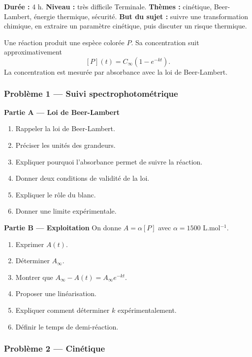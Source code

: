 \documentclass[11pt,a4paper]{article}
\begin{document}
\hypertarget{PC-EXCELLENCE-04}{}
\begin{difficile}
\textbf{Durée :} 4 h.  
\textbf{Niveau :} très difficile Terminale.  
\textbf{Thèmes :} cinétique, Beer-Lambert, énergie thermique, sécurité.  
\textbf{But du sujet :} suivre une transformation chimique, en extraire un paramètre cinétique, puis discuter un risque thermique.

\medskip

Une réaction produit une espèce colorée $P$. Sa concentration suit approximativement
\[
[P](t)=C_\infty(1-e^{-kt}).
\]
La concentration est mesurée par absorbance avec la loi de Beer-Lambert.

\subsubsection*{Problème 1 — Suivi spectrophotométrique}

\textbf{Partie A — Loi de Beer-Lambert}
\begin{enumerate}
  \item Rappeler la loi de Beer-Lambert.
  \item Préciser les unités des grandeurs.
  \item Expliquer pourquoi l'absorbance permet de suivre la réaction.
  \item Donner deux conditions de validité de la loi.
  \item Expliquer le rôle du blanc.
  \item Donner une limite expérimentale.
\end{enumerate}

\textbf{Partie B — Exploitation}
On donne $A=\alpha [P]$ avec $\alpha=1500$ L.mol$^{-1}$.
\begin{enumerate}
  \item Exprimer $A(t)$.
  \item Déterminer $A_\infty$.
  \item Montrer que $A_\infty-A(t)=A_\infty e^{-kt}$.
  \item Proposer une linéarisation.
  \item Expliquer comment déterminer $k$ expérimentalement.
  \item Définir le temps de demi-réaction.
\end{enumerate}

\subsubsection*{Problème 2 — Cinétique}


\end{difficile}
\end{document}

